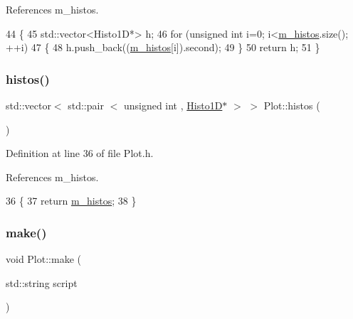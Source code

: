 References m\+\_\+histos.


\begin{DoxyCode}
44                                \{
45     std::vector<Histo1D*> h;
46     \textcolor{keywordflow}{for} (\textcolor{keywordtype}{unsigned} \textcolor{keywordtype}{int} i=0; i<\hyperlink{classPlot_a7edebf2b275223b8ce55f6ef3b2da0cc}{m\_histos}.size(); ++i)
47     \{
48       h.push\_back((\hyperlink{classPlot_a7edebf2b275223b8ce55f6ef3b2da0cc}{m\_histos}[i]).second);
49     \}
50     \textcolor{keywordflow}{return} h;
51   \}
\end{DoxyCode}
\mbox{\label{classPlot_af72e70c6b53df941708cd8d971083227}} 
\subsubsection{\texorpdfstring{histos()}{histos()}}
{\footnotesize\ttfamily std\+::vector$<$ std\+::pair $<$ unsigned int , \hyperlink{classHisto1D}{Histo1D}$\ast$ $>$ $>$ Plot\+::histos (\begin{DoxyParamCaption}{ }\end{DoxyParamCaption})\hspace{0.3cm}{\ttfamily [inline]}}



Definition at line 36 of file Plot.\+h.



References m\+\_\+histos.


\begin{DoxyCode}
36                                                             \{
37     \textcolor{keywordflow}{return} \hyperlink{classPlot_a7edebf2b275223b8ce55f6ef3b2da0cc}{m\_histos};
38   \}
\end{DoxyCode}
\mbox{\label{classPlot_abe449e7c57a55f3bf0ee9201d07d497d}} 
\subsubsection{\texorpdfstring{make()}{make()}}
{\footnotesize\ttfamily void Plot\+::make (\begin{DoxyParamCaption}\item[{std\+::string}]{script }\end{DoxyParamCaption})\hspace{0.3cm}{\ttfamily [inline]}}




